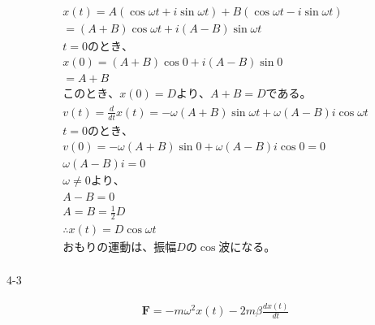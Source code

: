 \documentclass[dvipdfmx,uplatex]{jsarticle}
\begin{document}
  \newpage
  \begin{equation}
    \begin{aligned}
        &x(t) = A(\cos \omega t + i \sin \omega t) + B(\cos \omega t -i \sin \omega t)\nonumber\\
        &=(A+B)\cos \omega t + i(A-B)\sin \omega t\nonumber\\
        &t=0のとき、\nonumber\\
        &x(0)=(A+B)\cos0 + i(A-B)\sin0\nonumber\\
        &=A+B\nonumber\\
        &このとき、x(0)=Dより、A+B=Dである。\nonumber\\
        &v(t)=\frac{d}{dt}x(t) = -\omega(A+B)\sin \omega t + \omega(A-B)i\cos \omega t\nonumber\\
        &t=0のとき、\nonumber\\
        &v(0)=-\omega(A+B)\sin0 + \omega(A-B)i\cos0=0\nonumber\\
        &\omega(A-B)i=0\nonumber\\
        &\omega \neq 0より、\nonumber\\
        &A-B=0\nonumber\\
        &A=B=\frac{1}{2}D\nonumber\\
        &\therefore x(t) = D\cos\omega t\nonumber\\
        &おもりの運動は、振幅Dの \cos 波になる。\nonumber\\
    \end{aligned}
  \end{equation}


  \vspace{5mm}
  \centerline{\LARGE 4-3}
  \vspace{5mm}
  \begin{equation}
    \begin{aligned}
        &\bm{F}=-m\omega^2x(t) -2m\beta\frac{dx(t)}{dt}\nonumber\\
    \end{aligned}
  \end{equation}
\end{document}
